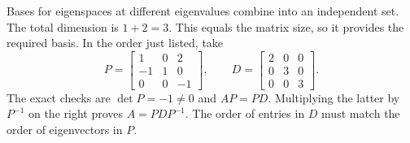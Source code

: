 Bases for eigenspaces at different eigenvalues combine into an independent set. The total dimension is $1+2=3$.
This equals the matrix size, so it provides the required basis. In the order just listed, take
\[P=\begin{bmatrix}1&0&2\\-1&1&0\\0&0&-1\end{bmatrix},\qquad D=\begin{bmatrix}2&0&0\\0&3&0\\0&0&3\end{bmatrix}.\]
The exact checks are $\det P=-1\ne0$ and $AP=PD$. Multiplying the latter by $P^{-1}$ on the right proves $A=PDP^{-1}$. The order of entries in $D$ must match the order of eigenvectors in $P$.


